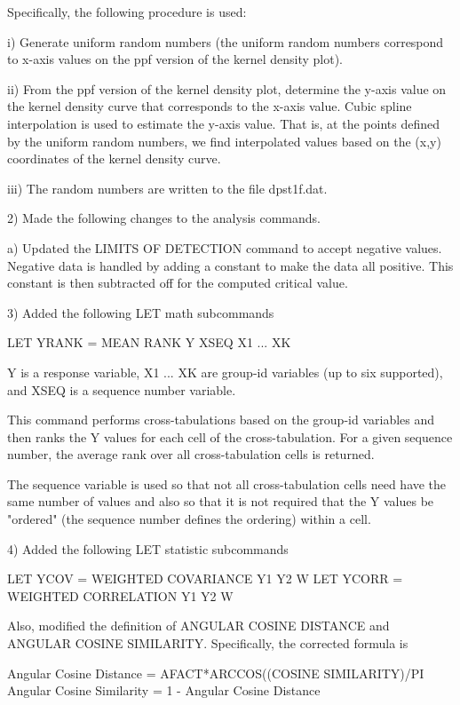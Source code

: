     Specifically, the following procedure is used:

        i) Generate uniform random numbers (the uniform random numbers
           correspond to x-axis values on the ppf version of the kernel
           density plot).

       ii) From the ppf version of the kernel density plot, determine
           the y-axis value on the kernel density curve that corresponds
           to the x-axis value.  Cubic spline interpolation is used to
           estimate the y-axis value.  That is, at the points defined
           by the uniform random numbers, we find interpolated values
           based on the (x,y) coordinates of the kernel density curve.

      iii) The random numbers are written to the file dpst1f.dat.

 2) Made the following changes to the analysis commands.

    a) Updated the LIMITS OF DETECTION command to accept negative values.
       Negative data is handled by adding a constant to make the data all
       positive.  This constant is then subtracted off for the computed
       critical value.

 3) Added the following LET math subcommands

      LET YRANK = MEAN RANK Y XSEQ X1 ... XK

    Y is a response variable, X1 ... XK are group-id variables (up to
    six supported), and XSEQ is a sequence number variable.

    This command performs cross-tabulations based on the group-id
    variables and then ranks the Y values for each cell of the
    cross-tabulation.  For a given sequence number, the average rank over
    all cross-tabulation cells is returned.

    The sequence variable is used so that not all cross-tabulation cells
    need have the same number of values and also so that it is not
    required that the Y values be "ordered" (the sequence number defines the
    ordering) within a cell.

 4) Added the following LET statistic subcommands

      LET YCOV  = WEIGHTED COVARIANCE  Y1 Y2 W
      LET YCORR = WEIGHTED CORRELATION Y1 Y2 W

    Also, modified the definition of ANGULAR COSINE DISTANCE and
    ANGULAR COSINE SIMILARITY.  Specifically, the corrected formula is

      Angular Cosine Distance = AFACT*ARCCOS((COSINE SIMILARITY)/PI
      Angular Cosine Similarity = 1 - Angular Cosine Distance

